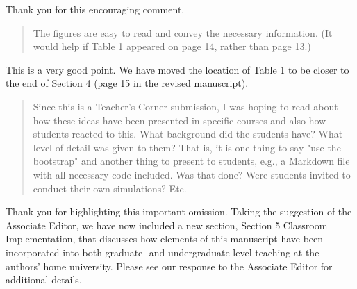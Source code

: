 \documentclass[12pt]{article}
\newenvironment{comment}%
{\begin{quotation}\noindent\small\it\color{darkblue}\ignorespaces%
}{\end{quotation}}
\begin{document}
Thank you for this encouraging comment.  


\begin{comment}
The figures are easy to read and convey the necessary information. (It would 
help if Table 1 appeared on page 14, rather than page 13.)
\end{comment}


This is a very good point.  We have moved the location of Table 1 to be closer 
to the end of Section 4 (page 15 in the revised manuscript).  


\begin{comment}
Since this is a Teacher's Corner submission, I was hoping to read about how 
these ideas have been presented in specific courses and also how students 
reacted to this. What background did the students have? What level of detail 
was given to them? That is, it is one thing to say "use the bootstrap" and 
another thing to present to students, e.g., a Markdown file with all necessary
code included. Was that done? Were students invited to conduct their own 
simulations? Etc.
\end{comment} 


Thank you for highlighting this important omission. Taking the suggestion of the 
Associate Editor, we have now included a new section, Section 5 Classroom 
Implementation, that discusses how elements of
this manuscript have been incorporated into both graduate- and 
undergraduate-level teaching at the authors' home university. 
Please see our response to the Associate Editor for additional details. 

%
%
\end{document}
